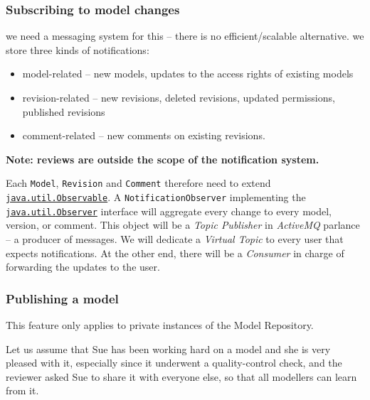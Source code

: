 \subsubsection{Subscribing to model changes}

\begin{techNote}
we need a messaging system for this -- there is no efficient/scalable alternative. we store three kinds of notifications: 
\begin{itemize}
\item model-related -- new models, updates to the access rights of existing models
\item revision-related -- new revisions, deleted revisions, updated permissions, published revisions
\item comment-related -- new comments on existing revisions.
\end{itemize}
\textbf{Note: reviews are outside the scope of the notification system.}

Each \texttt{Model}, \texttt{Revision} and \texttt{Comment} therefore need to extend \href{http://docs.oracle.com/javase/6/docs/api/java/util/Observable.html}{\texttt{java.util.Observable}}. A \texttt{NotificationObserver} implementing the \href{http://docs.oracle.com/javase/6/docs/api/java/util/Observer.html}{\texttt{java.util.Observer}} interface will aggregate every change to every model, version, or comment. This object will be a \emph{Topic Publisher} in \emph{ActiveMQ} parlance -- a producer of messages. We will dedicate a \emph{Virtual Topic} to every user that expects notifications. At the other end, there will be a \emph{Consumer} in charge of forwarding the updates to the user. 
\end{techNote}

\subsubsection{Publishing a model}
\label{publish}
This feature only applies to private instances of the \ddmore Model Repository. 

Let us assume that Sue has been working hard on a model and she is very pleased with it, especially since it underwent a quality-control check, and the reviewer asked Sue to share it with everyone else, so that all modellers can learn from it. 

